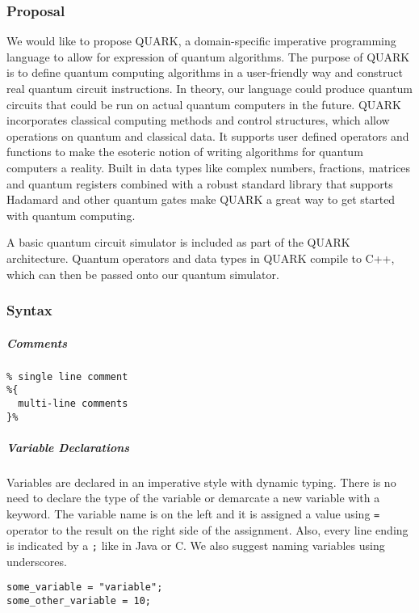 \documentclass[]{article}
\begin{document}
\subsubsection{Proposal}\label{proposal}

We would like to propose QUARK, a domain-specific imperative programming
language to allow for expression of quantum algorithms. The purpose of
QUARK is to define quantum computing algorithms in a user-friendly way
and construct real quantum circuit instructions. In theory, our language
could produce quantum circuits that could be run on actual quantum
computers in the future. QUARK incorporates classical computing methods
and control structures, which allow operations on quantum and classical
data. It supports user defined operators and functions to make the
esoteric notion of writing algorithms for quantum computers a reality.
Built in data types like complex numbers, fractions, matrices and
quantum registers combined with a robust standard library that supports
Hadamard and other quantum gates make QUARK a great way to get started
with quantum computing.

A basic quantum circuit simulator is included as part of the QUARK
architecture. Quantum operators and data types in QUARK compile to C++,
which can then be passed onto our quantum simulator.

\subsubsection{Syntax}\label{syntax}

\subparagraph{Comments}\label{comments}

\begin{verbatim}
% single line comment
%{
  multi-line comments
}%
\end{verbatim}

\subparagraph{Variable Declarations}\label{variable-declarations}

Variables are declared in an imperative style with dynamic typing. There
is no need to declare the type of the variable or demarcate a new
variable with a keyword. The variable name is on the left and it is
assigned a value using \texttt{=} operator to the result on the right
side of the assignment. Also, every line ending is indicated by a
\texttt{;} like in Java or C. We also suggest naming variables using
underscores.

\begin{verbatim}
some_variable = "variable";
some_other_variable = 10;
\end{verbatim}
\end{document}
